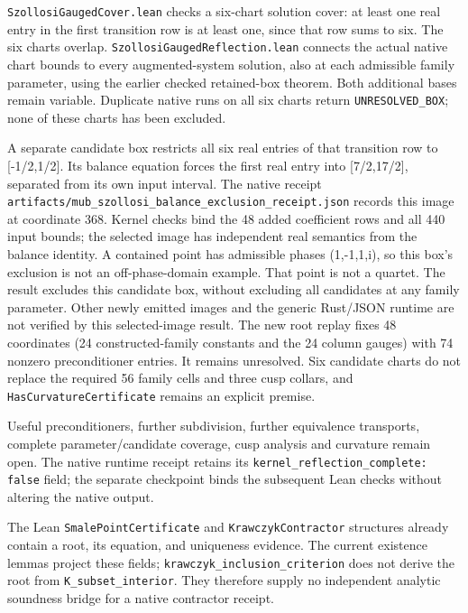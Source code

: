 \documentclass[
]{article}
\begin{document}
\nolinkurl{SzollosiGaugedCover.lean} checks a six-chart solution cover:
at least one real entry in the first transition row is at least one,
since that row sums to six. The six charts overlap.
\nolinkurl{SzollosiGaugedReflection.lean} connects the actual native
chart bounds to every augmented-system solution, also at each admissible
family parameter, using the earlier checked retained-box theorem. Both
additional bases remain variable. Duplicate native runs on all six
charts return \nolinkurl{UNRESOLVED_BOX}; none of these charts has been
excluded.

A separate candidate box restricts all six real entries of that
transition row to {[}-1/2,1/2{]}. Its balance equation forces the first
real entry into {[}7/2,17/2{]}, separated from its own input interval.
The native receipt
\nolinkurl{artifacts/mub_szollosi_balance_exclusion_receipt.json}
records this image at coordinate 368. Kernel checks bind the 48 added
coefficient rows and all 440 input bounds; the selected image has
independent real semantics from the balance identity. A contained point
has admissible phases (1,-1,1,i), so this box's exclusion is not an
off-phase-domain example. That point is not a quartet. The result
excludes this candidate box, without excluding all candidates at any
family parameter. Other newly emitted images and the generic Rust/JSON
runtime are not verified by this selected-image result. The new root
replay fixes 48 coordinates (24 constructed-family constants and the 24
column gauges) with 74 nonzero preconditioner entries. It remains
unresolved. Six candidate charts do not replace the required 56 family
cells and three cusp collars, and \nolinkurl{HasCurvatureCertificate}
remains an explicit premise.

Useful preconditioners, further subdivision, further equivalence
transports, complete parameter/candidate coverage, cusp analysis and
curvature remain open. The native runtime receipt retains its
\nolinkurl{kernel_reflection_complete: false} field; the separate
checkpoint binds the subsequent Lean checks without altering the native
output.

The Lean \nolinkurl{SmalePointCertificate} and
\nolinkurl{KrawczykContractor} structures already contain a root, its
equation, and uniqueness evidence. The current existence lemmas project
these fields; \nolinkurl{krawczyk_inclusion_criterion} does not derive
the root from \nolinkurl{K_subset_interior}. They therefore supply no
independent analytic soundness bridge for a native contractor receipt.
\end{document}
